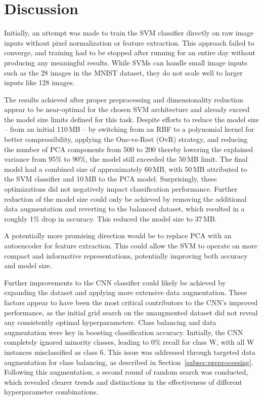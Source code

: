 \documentclass[a4, 10 pt, conference]{ieeeconf}  %
\begin{document}
\section{Discussion}
\label{sec:discuss}

Initially, an attempt was made to train the SVM classifier directly on raw image inputs without pixel normalization or feature extraction. This approach failed to converge, and training had to be stopped after running for an entire day without producing any meaningful results. While SVMs can handle small image inputs such as the 28 images in the MNIST dataset, they do not scale well to larger inputs like 128 images.

The results achieved after proper preprocessing and dimensionality reduction appear to be near-optimal for the chosen SVM architecture and already exceed the model size limits defined for this task. Despite efforts to reduce the model size -- from an initial 110\,MB -- by switching from an RBF to a polynomial kernel for better compressibility, applying the One-vs-Rest (OvR) strategy, and reducing the number of PCA components from 500 to 200 thereby lowering the explained variance from 95\% to 90\%, the model still exceeded the 50\,MB limit. The final model had a combined size of approximately 60\,MB, with 50\,MB attributed to the SVM classifier and 10\,MB to the PCA model.
Surprisingly, these optimizations did not negatively impact classification performance. Further reduction of the model size could only be achieved by removing the additional data augmentation and reverting to the balanced dataset, which resulted in a roughly 1\% drop in accuracy. This reduced the model size to 37\,MB.

A potentially more promising direction would be to replace PCA with an autoencoder for feature extraction. This could allow the SVM to operate on more compact and informative representations, potentially improving both accuracy and model size.

Further improvements to the CNN classifier could likely be achieved by expanding the dataset and 
applying more extensive data augmentation. These factors appear to have been the most critical contributors to the CNN's 
improved performance, as the initial grid search on the unaugmented dataset did not reveal any consistently optimal 
hyperparameters. Class balancing and data augmentation were key in boosting classification accuracy. Initially, the CNN 
completely ignored minority classes, leading to 0\% recall for class W, with all W instances misclassified as class 6. 
This issue was addressed through targeted data augmentation for class balancing, as described in Section~\ref{subsec:preprocessing}. 
Following this augmentation, a second round of random search was conducted, which revealed clearer trends and distinctions 
in the effectiveness of different hyperparameter combinations.
\end{document}
